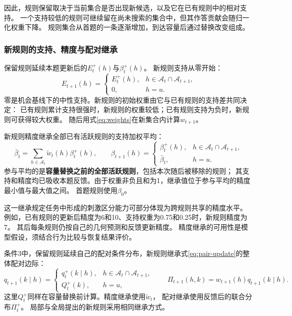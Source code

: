 \documentclass[11pt,a4paper]{article}
\numberwithin{equation}{section}
\newcommand{\A}{\mathcal{A}}
\begin{document}
因此，规则保留取决于当前集合是否出现新候选，以及它在已有规则中的相对支持。
一个支持较低的规则可继续留在尚未搜索的集合中，但其作答贡献会随归一化权重下降。
规则集合从首题的一条逐渐增加，到达容量后通过替换改变组成。

\subsubsection{新规则的支持、精度与配对继承}
\label{sec:transfer}
保留规则延续本题更新后的$E_t^+(h)$与$\beta_t^+(h)$。
新规则支持从零开始：
\begin{equation}
E_{t+1}(h)=\begin{cases}E_t^+(h),&h\in\A_t\cap\A_{t+1},\\0,&h=u.\end{cases}
\label{eq:entry-evidence}
\end{equation}
零是机会基线下的中性支持。新规则的初始权重由它与已有规则的支持差共同决定：
已有规则累计支持很强时，新规则的权重较低；已有规则支持为负时，新规则可获得较大权重。
随后用式\eqref{eq:weights}在新集合内计算$w_{t+1}$。

新规则精度继承全部已有活跃规则的支持加权平均：
\begin{equation}
\bar\beta_t=\sum_{h\in\A_t}\widetilde w_t(h)\beta_t^+(h),\qquad
\beta_{t+1}(h)=\begin{cases}\beta_t^+(h),&h\in\A_t\cap\A_{t+1},\\
\bar\beta_t,&h=u.\end{cases}
\label{eq:transfer}
\end{equation}
参与平均的是\textbf{容量替换之前的全部活跃规则}，包括本次随后被移除的规则；
其支持和精度均已吸收本题反馈。由于权重非负且和为1，继承值位于参与平均的精度最小值与最大值之间。
首题规则使用$\beta_0$。

这一继承规定任务中形成的刺激区分能力可部分体现为跨规则共享的精度水平。
例如，已有规则的更新后精度为6和10、支持权重为0.75和0.25时，新规则精度为7。
其后每条规则仍按自己的几何预测和反馈更新精度。
精度继承的可用性是模型假设，须结合行为比较与恢复结果评价。

条件3中，保留规则延续自己的配对条件分布，新规则继承式\eqref{eq:pair-update}的整体配对边际：
\begin{equation}
q_{t+1}(k\mid h)=\begin{cases}q_t^+(k\mid h),&h\in\A_t\cap\A_{t+1},\\
Q_t^+(k),&h=u,\end{cases}\qquad
\Pi_{t+1}(h,k)=w_{t+1}(h)q_{t+1}(k\mid h).
\label{eq:pair-transfer}
\end{equation}
这里$Q_t^+$同样在容量替换前计算。精度继承使用$\widetilde w_t$，
配对继承使用反馈后的联合分布$\Pi_t^+$。
局部与全局提出的新规则采用相同继承方式。
\end{document}
